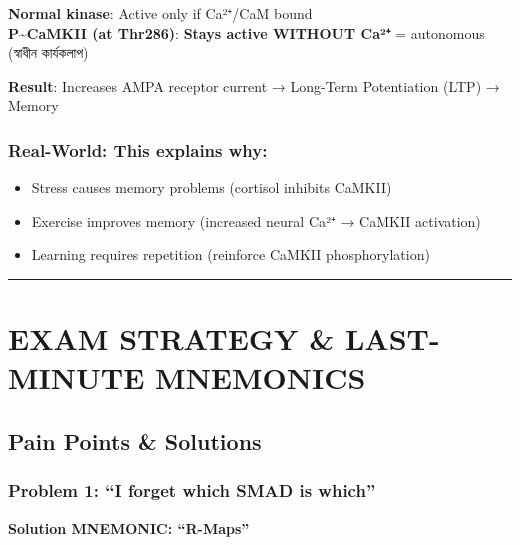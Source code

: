 \textbf{Normal kinase}: Active only if Ca²⁺/CaM bound\\
\textbf{P\textasciitilde CaMKII (at Thr286)}: \textbf{Stays active
WITHOUT Ca²⁺} = autonomous (স্বাধীন কার্যকলাপ)

\textbf{Result}: Increases AMPA receptor current → Long-Term
Potentiation (LTP) → Memory

\hypertarget{real-world-this-explains-why}{%
\subsection{\texorpdfstring{\textbf{Real-World}: This explains
why:}{Real-World: This explains why:}}\label{real-world-this-explains-why}}

\begin{itemize}
\tightlist
\item
  Stress causes memory problems (cortisol inhibits CaMKII)
\item
  Exercise improves memory (increased neural Ca²⁺ → CaMKII activation)
\item
  Learning requires repetition (reinforce CaMKII phosphorylation)
\end{itemize}

\begin{center}\rule{0.5\linewidth}{0.5pt}\end{center}

\hypertarget{exam-strategy-last-minute-mnemonics}{%
\chapter{EXAM STRATEGY \& LAST-MINUTE
MNEMONICS}\label{exam-strategy-last-minute-mnemonics}}

\hypertarget{pain-points-solutions}{%
\section{Pain Points \& Solutions}\label{pain-points-solutions}}

\hypertarget{problem-1-i-forget-which-smad-is-which}{%
\subsection{\texorpdfstring{\textbf{Problem 1: ``I forget which SMAD is
which''}}{Problem 1: ``I forget which SMAD is which''}}\label{problem-1-i-forget-which-smad-is-which}}

\textbf{Solution MNEMONIC: ``R-Maps''}

